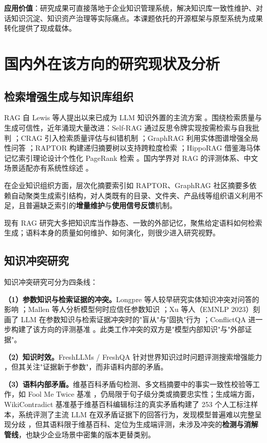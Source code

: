 \textbf{应用价值}：研究成果可直接落地于企业知识管理系统，解决知识库一致性维护、对话知识沉淀、知识资产治理等实际痛点。本课题依托的开源框架与原型系统为成果转化提供了现成载体。

\section{国内外在该方向的研究现状及分析}

\subsection{检索增强生成与知识库组织}

RAG 自 Lewis 等人提出以来已成为 LLM 知识外置的主流方案 \cite{lewis2020}。围绕检索质量与生成可信性，近年涌现大量改进：Self-RAG 通过反思令牌实现按需检索与自我批判 \cite{asai2024}；CRAG 引入检索质量评估与纠错机制 \cite{yan2024}；GraphRAG 利用实体图谱增强全局性问答 \cite{edge2024}；RAPTOR 构建递归摘要树以支持跨粒度检索 \cite{sarthi2024}；HippoRAG 借鉴海马体记忆索引理论设计个性化 PageRank 检索 \cite{gutierrez2024}。国内学界对 RAG 的评测体系、中文场景适配亦有系统性综述 \cite{gao2023,yuan2026}。

在企业知识组织方面，层次化摘要索引如 RAPTOR、GraphRAG 社区摘要多依赖自动聚类生成索引结构，对人类既有的目录、文件夹、产品线等组织语义利用不足，且普遍缺乏索引的\textbf{增量维护}与\textbf{使用信号反馈}机制。

现有 RAG 研究大多把知识库当作静态、一致的外部记忆，聚焦给定语料如何检索生成；语料本身的质量如何维护、如何演化，则很少进入研究视野。

\subsection{知识冲突研究}

知识冲突研究可分为四条线：

\textbf{（1）参数知识与检索证据的冲突。}Longpre 等人较早研究实体知识冲突对问答的影响 \cite{longpre2021}；Mallen 等人分析模型何时应信任参数知识 \cite{mallen2023}；Xu 等人（EMNLP 2023）刻画了 LLM 在参数知识与检索证据冲突时的"盲从"与"固执"行为 \cite{xu2023}；ConflictQA 进一步构建了该方向的评测基准 \cite{xie2024}。此类工作冲突的双方是"模型内部知识"与"外部证据"。

\textbf{（2）知识时效。}FreshLLMs / FreshQA 针对世界知识过时问题评测搜索增强能力 \cite{vu2024}，但其关注"证据新于参数"，而非语料内部的矛盾。

\textbf{（3）语料内部矛盾。}维基百科矛盾句检测、多文档摘要中的事实一致性校验等工作，如 Fool Me Twice 基准 \cite{zhong2021}，仍局限于句子级分类或摘要忠实性；生成端方面，WikiContradict 基准基于维基百科编辑标注的真实矛盾构建了 253 个人工标注样本，系统评测了主流 LLM 在双矛盾证据下的回答行为，发现模型普遍难以完整呈现分歧 \cite{hou2024wikicontradict}，但其语料限于维基百科、定位为生成端评测，未涉及冲突的\textbf{检测与消解管线}，也缺少企业场景中密集的版本更替类别。

